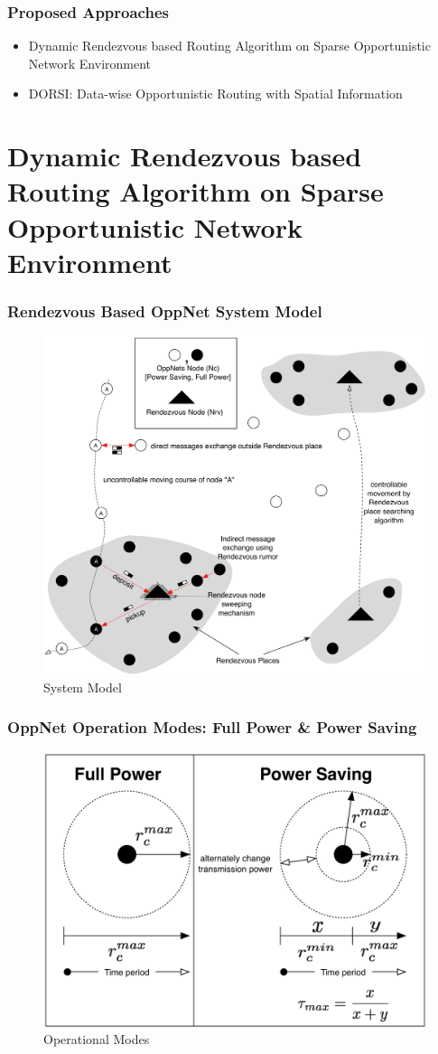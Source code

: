\documentclass{beamer}
\begin{document}
\begin{frame}
	\frametitle{Proposed Approaches}
	\begin{itemize}
		\item Dynamic Rendezvous based Routing Algorithm on Sparse Opportunistic Network Environment 
	
		
		\item DORSI: Data-wise Opportunistic Routing with Spatial Information
		
		
	\end{itemize}
\end{frame}

\section{Dynamic Rendezvous based Routing Algorithm on Sparse Opportunistic Network Environment}
\begin{frame}
	\frametitle{Rendezvous Based OppNet System Model}
	\begin{figure}
\centering
\includegraphics[width=0.7\linewidth]{Figures_Present/NewSystemModel}
\caption{System Model}
\label{fig:NewSystemModel}
\end{figure}
\end{frame}
\begin{frame}
	\frametitle{OppNet Operation Modes: Full Power \& Power Saving}
	\begin{figure}
\centering
\includegraphics[width=0.7\linewidth]{Figures_Present/OperationalMode}
\caption{Operational Modes}
\label{fig:OperationalMode}
\end{figure}
\end{frame}
\end{document}
